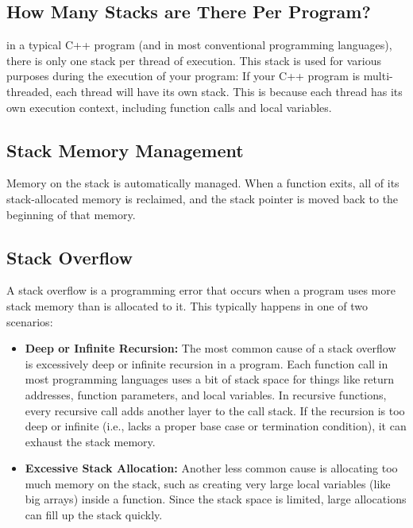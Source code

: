 \documentclass{report}
\begin{document}
    \bigbreak \noindent 
    \subsection{How Many Stacks are There Per Program?}
    \bigbreak \noindent 
    in a typical C++ program (and in most conventional programming languages), there is only one stack per thread of execution. This stack is used for various purposes during the execution of your program:
    \bigbreak \noindent 
    If your C++ program is multi-threaded, each thread will have its own stack. This is because each thread has its own execution context, including function calls and local variables.

    \pagebreak 
    \subsection{Stack Memory Management}
    \bigbreak \noindent 
    Memory on the stack is automatically managed. When a function exits, all of its stack-allocated memory is reclaimed, and the stack pointer is moved back to the beginning of that memory.

    \subsection{Stack Overflow}
    \bigbreak \noindent 
    \begin{concept}
        A stack overflow is a programming error that occurs when a program uses more stack memory than is allocated to it. This typically happens in one of two scenarios:
        \begin{itemize}
            \item \textbf{Deep or Infinite Recursion:} The most common cause of a stack overflow is excessively deep or infinite recursion in a program. Each function call in most programming languages uses a bit of stack space for things like return addresses, function parameters, and local variables. In recursive functions, every recursive call adds another layer to the call stack. If the recursion is too deep or infinite (i.e., lacks a proper base case or termination condition), it can exhaust the stack memory.
            \item \textbf{Excessive Stack Allocation:} Another less common cause is allocating too much memory on the stack, such as creating very large local variables (like big arrays) inside a function. Since the stack space is limited, large allocations can fill up the stack quickly.
        \end{itemize}
    \end{concept}
\end{document}

